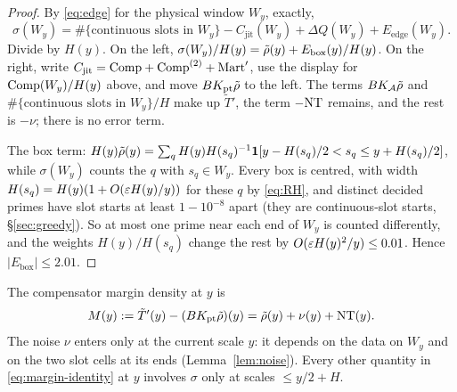 \begin{proof}
By \eqref{eq:edge} for the physical window $W_y$, exactly,
\[
  \sigma(W_y)=\#\{\text{continuous slots in }W_y\}-C_{\mathrm{jit}}(W_y)+\Delta Q(W_y)+E_{\mathrm{edge}}(W_y).
\]
Divide by $H(y)$. On the left,
$\sigma(W_y)/H(y)=\tilde\rho(y)+E_{\mathrm{box}}(y)/H(y)$. On the right, write $C_{\mathrm{jit}}=\mathrm{Comp}+\mathrm{Comp}^{(2)}+\mathrm{Mart}'$, use the display
for $\mathrm{Comp}(W_y)/H(y)$ above, and move $BK_{\mathrm{pt}}\tilde\rho$ to the left. The terms $BK_{\mathcal{A}}\tilde\rho$ and
$\#\{\text{continuous slots in }W_y\}/H$ make up $\tilde T'$, the term $-\mathrm{NT}$ remains, and the rest is $-\nu$; there is no error term.

The box term: $H(y)\tilde\rho(y)=\sum_qH(y)H(s_q)^{-1}\mathbf 1[y-H(s_q)/2<s_q\le y+H(s_q)/2]$, while $\sigma(W_y)$ counts the $q$ with
$s_q\in W_y$. Every box is centred, with width $H(s_q)=H(y)(1+O(\varepsilon H(y)/y))$ for these $q$ by \eqref{eq:RH}, and distinct
decided primes have slot starts at least $1-10^{-8}$ apart (they are continuous-slot starts, \S\ref{sec:greedy}). So at most one prime near each end of
$W_y$ is counted differently, and the weights $H(y)/H(s_q)$ change the rest by $O(\varepsilon H(y)^2/y)\le0.01$. Hence
$|E_{\mathrm{box}}|\le2.01$.
\end{proof}

The compensator margin density at $y$ is
\begin{equation}\label{eq:M}
  M(y):=\tilde T'(y)-(BK_{\mathrm{pt}}\tilde\rho)(y)=\tilde\rho(y)+\nu(y)+\mathrm{NT}(y).
\end{equation}
The noise $\nu$ enters only at the current scale $y$: it depends on the data on $W_y$ and on the two slot cells at its ends (Lemma~\ref{lem:noise}). Every other
quantity in \eqref{eq:margin-identity} at $y$ involves $\sigma$ only at scales $\le y/2+H$.

